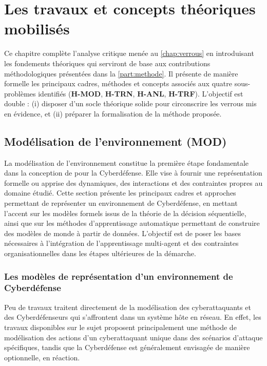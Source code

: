 \clearpage
\thispagestyle{empty}
\null
\newpage

\chapter{Les travaux et concepts théoriques mobilisés}
\label{chap:concepts}

\noindent
Ce chapitre complète l'analyse critique menée au \autoref{chap:verrous} en introduisant
les fondements théoriques qui serviront de base aux contributions méthodologiques
présentées dans la \autoref{part:methode}.
Il présente de manière formelle les principaux cadres, méthodes et concepts
associés aux quatre sous-problèmes identifiés (\textbf{H-MOD}, \textbf{H-TRN}, \textbf{H-ANL}, \textbf{H-TRF}).
%
L'objectif est double :
(i) disposer d'un socle théorique solide pour circonscrire les verrous mis en évidence, et
(ii) préparer la formalisation de la méthode proposée.

\section{Modélisation de l'environnement (MOD)}

\noindent
La modélisation de l'environnement constitue la première étape fondamentale dans la conception de  pour la Cyberdéfense. Elle vise à fournir une représentation formelle ou apprise des dynamiques, des interactions et des contraintes propres au domaine étudié. Cette section présente les principaux cadres et approches permettant de représenter un environnement de Cyberdéfense, en mettant l'accent sur les modèles formels issus de la théorie de la décision séquentielle, ainsi que sur les méthodes d'apprentissage automatique permettant de construire des modèles de monde à partir de données. L'objectif est de poser les bases nécessaires à l'intégration de l'apprentissage multi-agent et des contraintes organisationnelles dans les étapes ultérieures de la démarche.

\subsection{Les modèles de représentation d'un environnement de Cyberdéfense}

Peu de travaux traitent directement de la modélisation des cyberattaquants et des Cyberdéfenseurs qui s'affrontent dans un système hôte en réseau. En effet, les travaux disponibles sur le sujet proposent principalement une méthode de modélisation des actions d'un cyberattaquant unique dans des scénarios d'attaque spécifiques, tandis que la Cyberdéfense est généralement envisagée de manière optionnelle, en réaction.

